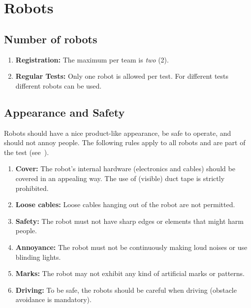 \section{Robots}
\label{rule:robots}

\subsection{Number of robots}
\label{rule:robots_number}

\begin{enumerate}
	\item \textbf{Registration:} The maximum  per team is \emph{two} (2).
	\item \textbf{Regular Tests:} Only one robot is allowed per test. For different tests different robots can be used.
\end{enumerate}

\subsection{Appearance and Safety}
\label{rule:robot_appearance}

Robots should have a nice product-like appearance, be safe to operate, and should not annoy people. The following rules apply to all robots and are part of the  test (see~).
\begin{enumerate}
	\item \textbf{Cover:} The robot's internal hardware (electronics and cables) should be covered in an appealing way. The use of (visible) duct tape is strictly prohibited.
	\item \textbf{Loose cables:} Loose cables hanging out of the robot are not permitted.
	\item \textbf{Safety:} The robot must not have sharp edges or elements that might harm people.
	\item \textbf{Annoyance:} The robot must not be continuously making loud noises or use blinding lights.
	\item \textbf{Marks:} The robot may not exhibit any kind of artificial marks or patterns.
	\item \textbf{Driving:} To be safe, the robots should be careful when driving (obstacle avoidance is mandatory).
\end{enumerate}







